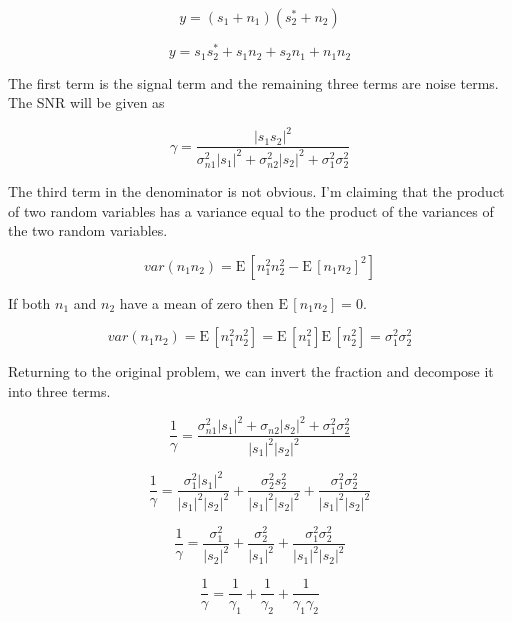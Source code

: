 \documentclass[11pt]{article}
\def\E{{\textrm{E}}\,}
\begin{document}
\begin{equation}
y = (s_1 + n_1)(s_2^* + n_2)
\end{equation}

\begin{equation}
y = s_1 s^*_2 + s_1 n_2 + s_2 n_1 + n_1 n_2
\end{equation}

The first term is the signal term and the remaining three terms are noise terms. The SNR will be given as

\begin{equation}
\gamma = \frac{|s_1 s_2|^2}{\sigma_{n1}^2 |s_1|^2 + \sigma_{n2}^2 |s_2|^2 + \sigma_1^2 \sigma_2^2}
\end{equation}

The third term in the denominator is not obvious. I'm claiming that the product of two random variables has a variance equal to the product of the variances of the two random variables.

\begin{equation}
var (n_1 n_2) = \E[n_1^2 n_2^2 - \E[n_1 n_2]^2]
\end{equation}

If both $n_1$ and $n_2$ have a mean of zero then $\E[n_1 n_2] = 0$.

\begin{equation}
var(n_1 n_2) = \E[n_1^2 n_2^2] = \E[n_1^2] \E[n_2^2] = \sigma_1^2\sigma_2^2
\end{equation}

Returning to the original problem, we can invert the fraction and decompose it into three terms.

\begin{equation}
\frac{1}{\gamma}
=
\frac{\sigma_{n1}^2 |s_1|^2 + \sigma_{n2} |s_2|^2 + \sigma_1^2 \sigma_2^2}{|s_1|^2 |s_2|^2}
\end{equation}

\begin{equation}
\frac{1}{\gamma}
=
\frac{\sigma_1^2 |s_1|^2}{|s_1|^2 |s_2|^2}
+
\frac{\sigma^2_2 s_2^2}{|s_1|^2 |s_2|^2}
+
\frac{\sigma_1^2 \sigma_2^2}{|s_1|^2 |s_2|^2}
\end{equation}

\begin{equation}
\frac{1}{\gamma}
=
\frac{\sigma_1^2}{|s_2|^2}
+
\frac{\sigma^2_2}{|s_1|^2}
+
\frac{\sigma_1^2 \sigma^2_2}{|s_1|^2 |s_2|^2}
\end{equation}

\begin{equation}
\boxed{
\frac{1}{\gamma}
=
\frac{1}{\gamma_1}
+
\frac{1}{\gamma_2}
+
\frac{1}{\gamma_1 \gamma_2}
}
\end{equation}
\end{document}

